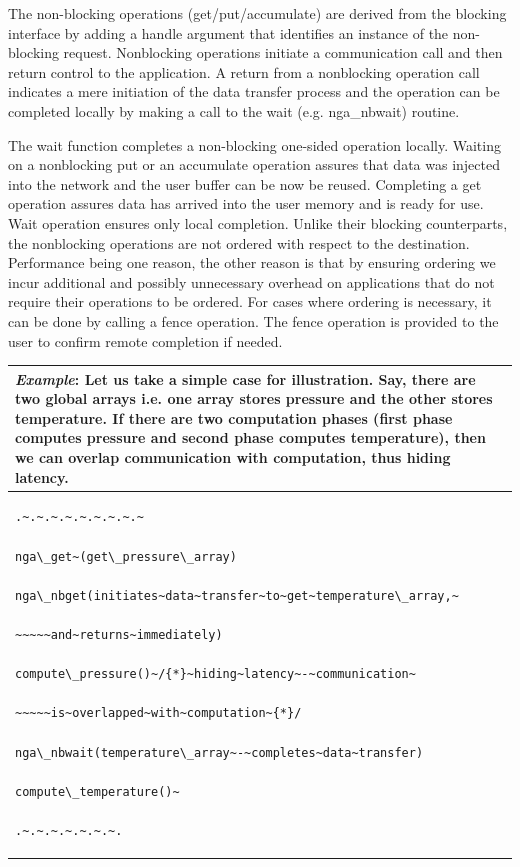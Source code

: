 The non-blocking operations (get/put/accumulate) are derived from
the blocking interface by adding a handle argument that identifies
an instance of the non-blocking request. Nonblocking operations initiate
a communication call and then return control to the application. A
return from a nonblocking operation call indicates a mere initiation
of the data transfer process and the operation can be completed locally
by making a call to the wait (e.g. nga\_nbwait) routine.

The wait function completes a non-blocking one-sided operation locally.
Waiting on a nonblocking put or an accumulate operation assures that
data was injected into the network and the user buffer can be now
be reused. Completing a get operation assures data has arrived into
the user memory and is ready for use. Wait operation ensures only
local completion. Unlike their blocking counterparts, the nonblocking
operations are not ordered with respect to the destination. Performance
being one reason, the other reason is that by ensuring ordering we
incur additional and possibly unnecessary overhead on applications
that do not require their operations to be ordered. For cases where
ordering is necessary, it can be done by calling a fence operation.
The fence operation is provided to the user to confirm remote completion
if needed.

\begin{tabular}{|>{\raggedright}p{13cm}|}
\hline 
\emph{Example}: Let us take a simple case for illustration. Say, there
are two global arrays i.e. one array stores pressure and the other
stores temperature. If there are two computation phases (first phase
computes pressure and second phase computes temperature), then we
can overlap communication with computation, thus hiding latency.\tabularnewline
\hline 
\begin{verbatim}
.~.~.~.~.~.~.~.~.~

nga\_get~(get\_pressure\_array)

nga\_nbget(initiates~data~transfer~to~get~temperature\_array,~

~~~~~and~returns~immediately)

compute\_pressure()~/{*}~hiding~latency~-~communication~

~~~~~is~overlapped~with~computation~{*}/

nga\_nbwait(temperature\_array~-~completes~data~transfer)

compute\_temperature()~

.~.~.~.~.~.~.~.
\end{verbatim}
\tabularnewline
\hline
\end{tabular}

